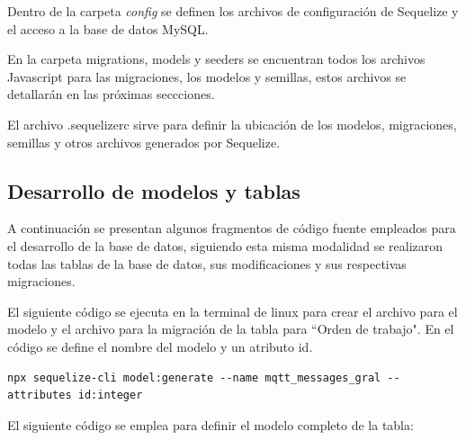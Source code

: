 Dentro de la carpeta \textit{config} se definen los archivos de configuración de Sequelize y el acceso a la base de datos MySQL.

En la carpeta migrations, models y seeders se encuentran todos los archivos Javascript para las migraciones, los modelos y semillas, estos archivos se detallarán en las próximas seccciones. 

El archivo .sequelizerc sirve para definir la ubicación de los modelos, migraciones, semillas y otros archivos generados por Sequelize.


\subsection{Desarrollo de modelos y tablas}
\label{subsec:modelobasededatos}



A continuación se presentan algunos fragmentos de código fuente empleados para el desarrollo de la base de datos, siguiendo esta misma modalidad se realizaron todas las tablas de la base de datos, sus modificaciones y sus respectivas migraciones.


El siguiente código se ejecuta en la terminal de linux para crear el archivo para el modelo y el archivo para la migración de la tabla para ``Orden de trabajo". En el código se define el nombre del modelo y un atributo id. 

\begin{lstlisting}[label=cod:sequelizeclimodel,caption=Código CLI para crear modelo y migración en Sequelize.]
npx sequelize-cli model:generate --name mqtt_messages_gral --attributes id:integer
\end{lstlisting}

El siguiente código se emplea para definir el modelo completo de la tabla:

